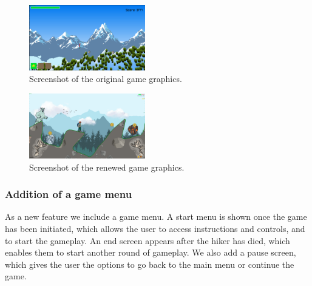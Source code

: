 \begin{figure}[h!]
    \centering
    \includegraphics[width=0.45\textwidth]{figures/old_game.jpeg}
    \caption{Screenshot of the original game graphics.}
    \label{fig:old_game}
  \end{figure}

\begin{figure}[h!]
    \centering
    \includegraphics[width=0.45\textwidth]{figures/new_game.png}
    \caption{Screenshot of the renewed game graphics.}
    \label{fig:new_game}
  \end{figure}

\subsubsection{Addition of a game menu}
As a new feature we include a game menu.
A start menu is shown once the game has been initiated, which allows the user to access instructions and controls, and to start the gameplay.
An end screen appears after the hiker has died, which enables them to start another round of gameplay. 
We also add a pause screen, which gives the user the options to go back to the main menu or continue the game.

